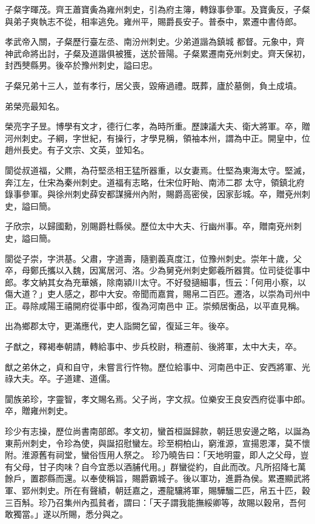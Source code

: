 \begin{pinyinscope}
 子粲字暉茂。齊王蕭寶夤為雍州刺史，引為府主簿，轉錄事參軍。及寶夤反，子粲與弟子爽執志不從，相率逃免。雍州平，賜爵長安子。普泰中，累遷中書侍郎。



 孝武帝入關，子粲歷行臺左丞、南汾州刺史。少弟道諧為鎮城
 都督。元象中，齊神武命將出討，子粲及道諧俱被獲，送於晉陽。子粲累遷南兗州刺史。齊天保初，封西僰縣男。後卒於豫州刺史，謚曰忠。



 子粲兄弟十三人，並有孝行，居父喪，毀瘠過禮。既葬，廬於墓側，負土成墳。



 弟榮亮最知名。



 榮亮字子昱。博學有文才，德行仁孝，為時所重。歷諫議大夫、衛大將軍。卒，贈河州刺史。子綱，字世紀，有操行，才學見稱，領袖本州，謂為中正。開皇中，位趙州長史。有子文宗、文英，並知名。



 閬從叔道福，父羆，為苻堅丞相王猛所器重，以女妻焉。仕堅為東海太守。堅滅，奔江左，仕宋為秦州刺史。道福有志略，仕宋位盱眙、南沛二郡
 太守，領鎮北府錄事參軍。與徐州刺史薛安都謀擁州內附，賜爵高密侯，因家彭城。卒，贈兗州刺史，謚曰簡。



 子欣宗，以歸國勳，別賜爵杜縣侯。歷位太中大夫、行幽州事。卒，贈南兗州刺史，謚曰簡。



 閬從子崇，字洪基。父肅，字道壽，隨劉義真度江，位豫州刺史。崇年十歲，父卒，母鄭氏攜以入魏，因寓居河、洛。少為舅兗州刺史鄭羲所器賞。位司徒從事中郎。孝文納其女為充華嬪，除南潁川太守。不好發擿細事，恆云：「何用小察，以傷大道？」吏人感之，郡中大安。帝聞而嘉賞，賜帛二百匹。遷洛，以崇為司州中正。尋除咸陽王禧開府從事中郎，復為河南邑中
 正。崇頻居衡品，以平直見稱。



 出為鄉郡太守，更滿應代，吏人詣闕乞留，復延三年。後卒。



 子猷之，釋褐奉朝請，轉給事中、步兵校尉，稍遷前、後將軍，太中大夫，卒。



 猷之弟休之，貞和自守，未嘗言行忤物。歷位給事中、河南邑中正、安西將軍、光祿大夫。卒。子道建、道儒。



 閬族弟珍，字靈智，孝文賜名焉。父子尚，字文叔。位樂安王良安西府從事中郎。卒，贈雍州刺史。



 珍少有志操，歷位尚書南部郎。孝文初，蠻首桓誕歸款，朝廷思安邊之略，以誕為東荊州刺史，令珍為使，與誕招慰蠻左。珍至桐柏山，窮淮源，宣揚恩澤，莫不懷附。淮源舊有祠堂，蠻俗恆用人祭之。
 珍乃曉告曰：「天地明靈，即人之父母，豈有父母，甘子肉味？自今宜悉以酒脯代用。」群蠻從約，自此而改。凡所招降七萬餘戶，置郡縣而還。以奉使稱旨，賜爵霸城子。後以軍功，進爵為侯。累遷顯武將軍、郢州刺史。所在有聲績，朝廷嘉之，遷龍驤將軍，賜驊騮二匹，帛五十匹，穀三百斛。珍乃召集州內孤貧者，謂曰：「天子謂我能撫綏卿等，故賜以穀帛，吾何敢獨當。」遂以所賜，悉分與之。




\end{pinyinscope}

